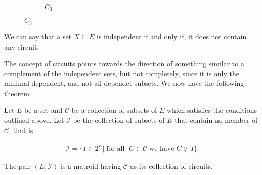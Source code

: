\begin{figure}
\begin{subfigure}[h]{0.2\textwidth}
\end{subfigure}
\begin{subfigure}[h]{0.2\textwidth}
  \caption{$C _3$ } 
\end{subfigure}
\end{figure}

We can say that a set $X \subseteq E$ is independent if and only if, it does not contain any circuit.

The concept of circuits points towards the direction of something similar to a complement of the independent sets, but not completely, since it is only the minimal dependent, and not all dependet subsets. We now have the following theorem.

\begin{theorem}\label{thm:matroid-circuit-definition}
Let $E$ be a set and $\mathcal C$ be a collection of subsets of $E$ which satisfies the conditions outlined above. Let  $\mathcal I$  be the collection of subsets of $E$ that contain no member of $\mathcal C$, that is 

\begin{align}
   \mathcal{I} = \{I \in 2^E |\; \text{for all } \; C \in \mathcal{C}\; \text{we have} \; C \not\subset I\}
    \label{independent-sets-from-circuits}
\end{align}

    The pair $(E,\mathcal I)$ is a matroid having $\mathcal C$ as its collection of circuits.
\end{theorem}

